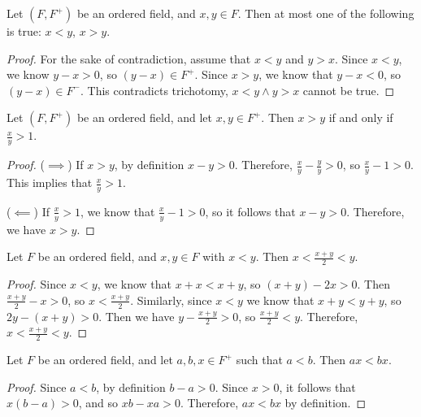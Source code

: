 \begin{prop}\label{trichotomy-exclusion}
    Let $(F, F^+)$ be an ordered field, and $x, y \in F$. Then at most one of the following is true: $x < y$, $x > y$.
\end{prop}

\begin{proof}
    For the sake of contradiction, assume that $x < y$ and $y > x$. Since $x < y$, we know $y - x > 0$, so $(y - x) \in F^+$. Since $x > y$, we know that $y - x < 0$, so $(y - x) \in F^-$. This contradicts trichotomy, $x < y \land y > x$ cannot be true.
\end{proof}

\begin{prop}\label{greater-than-ratio}
    Let $(F, F^+)$ be an ordered field, and let $x, y \in F^{+}$. Then $x > y$ if and only if $\frac{x}{y} > 1$.
\end{prop}

\begin{proof}\proofbreak
    ($\implies$) If $x > y$, by definition $x - y > 0$. Therefore, $\frac{x}{y} - \frac{y}{y} > 0$, so $\frac{x}{y} - 1 > 0$. This implies that $\frac{x}{y} > 1$.

    ($\impliedby$) If $\frac{x}{y} > 1$, we know that $\frac{x}{y} - 1 > 0$, so it follows that $x - y > 0$. Therefore, we have $x > y$.
\end{proof}

\begin{prop}\label{average-in-between}
    Let $F$ be an ordered field, and $x, y \in F$ with $x < y$. Then $x < \frac{x+y}{2} < y$.
\end{prop}

\begin{proof}
    Since $x < y$, we know that $x + x < x + y$, so $(x + y) - 2x > 0$. Then $\frac{x+y}{2} - x > 0$, so $x < \frac{x+y}{2}$. Similarly, since $x < y$ we know that $x + y < y + y$, so $2y - (x + y) > 0$. Then we have $y - \frac{x + y}{2} > 0$, so $\frac{x + y}{2} < y$. Therefore, $x < \frac{x+y}{2} < y$.
\end{proof}

\begin{prop}\label{multiplicative-inequality-one}
    Let $F$ be an ordered field, and let $a, b, x \in F^+$ such that $a < b$. Then $ax < bx$.
\end{prop}

\begin{proof}
    Since $a < b$, by definition $b - a > 0$. Since $x > 0$, it follows that $x(b-a) > 0$, and so $xb - xa > 0$. Therefore, $ax < bx$ by definition.
\end{proof}

